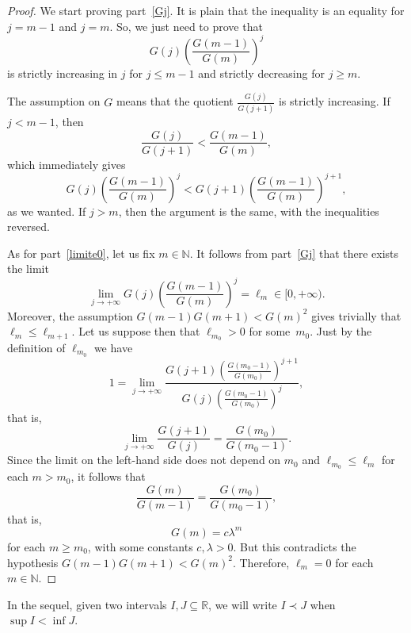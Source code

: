 \documentclass[10pt, a4paper, leqno]{amsart}
\numberwithin{equation}{section}
\theoremstyle{plain}
\theoremstyle{remark}
\newcommand{\RR}{\mathbb{R}}
\newcommand{\NN}{\mathbb{N}}
\begin{document}
\begin{proof}
We start proving part~\eqref{Gj}. It is plain that the inequality is an equality for $j=m-1$ and $j=m$. So, we just need to prove that
\[
  G(j) \left(\frac{G(m-1)}{G(m)}\right)^j
\]
is strictly increasing in $j$ for $j \le m-1$ and strictly decreasing for $j \ge m$.

The assumption on $G$ means that the quotient $\frac{G(j)}{G(j+1)}$ is strictly increasing. If $j < m-1$, then
\[
  \frac{G(j)}{G(j+1)} < \frac{G(m-1)}{G(m)},
\]
which immediately gives
\[
  G(j) \left( \frac{G(m-1)}{G(m)} \right)^j < G(j+1) \left( \frac{G(m-1)}{G(m)} \right)^{j+1},
\]
as we wanted. If $j > m$, then the argument is the same, with the inequalities reversed.

As for part~\eqref{limite0}, let us fix $m \in \NN$. It follows from part~\eqref{Gj} that there exists the limit
\[
  \lim_{j \to +\infty} G(j) \left(\frac{G(m-1)}{G(m)}\right)^j = \ell_m \in [0,+\infty).
\]
Moreover, the assumption $G(m-1) G(m+1) < G(m)^2$ gives trivially that $\ell_m \le \ell_{m+1}$. Let us suppose then that $\ell_{m_0} > 0$ for some~$m_0$. Just by the definition of $\ell_{m_0}$ we have
\[
  1 = \lim_{j \to +\infty}
  \frac{G(j+1) \left(\frac{G(m_0-1)}{G(m_0)}\right)^{j+1}}
  {G(j) \left(\frac{G(m_0-1)}{G(m_0)}\right)^j},
\]
that is,
\[
  \lim_{j \to +\infty} \frac{G(j+1)}{G(j)} = \frac{G(m_0)}{G(m_0-1)}.
\]
Since the limit on the left-hand side does not depend on $m_0$ and $\ell_{m_0} \le \ell_{m}$ for each $m > m_0$, it follows that
\[
  \frac{G(m)}{G(m-1)} = \frac{G(m_0)}{G(m_0-1)},
\]
that is,
\[
  G(m) = c \lambda^m
\]
for each $m \ge m_0$, with some constants $c, \lambda > 0$. But this contradicts the hypothesis $G(m-1) G(m+1) < G(m)^2$. Therefore, $\ell_m = 0$ for each $m \in \NN$.
\end{proof}


In the sequel, given two intervals $I, J \subseteq \RR$, we will write $I \prec J$ when $\sup I < \inf J$.
\end{document}

